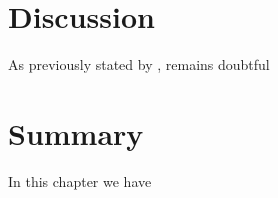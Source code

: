 
\section{Discussion}

As previously stated by , remains doubtful


\section{Summary}

In this chapter we have





